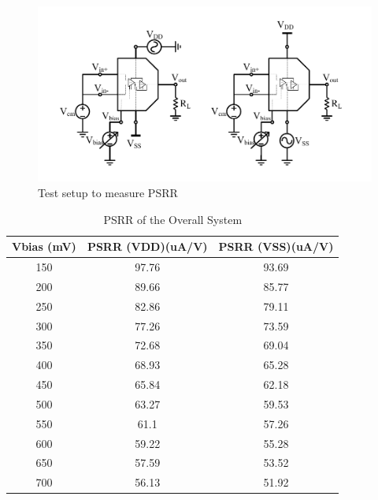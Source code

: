 \begin{figure} [H]
\centering
\includegraphics[scale=1]{Figures/Test_Benches/Overall/PSRR.pdf}
\caption{Test setup to measure PSRR}
\label{fig:TB_PSRR}
\end{figure}

\begin{table} [H]
\centering
\begin{tabular}{@{}ccc@{}}
\toprule
Vbias (mV)			& PSRR (VDD)(uA/V)			& PSRR (VSS)(uA/V)	 \\ \midrule
150					& 97.76	 					& 93.69					 \\
200					& 89.66 					& 85.77					 \\
250					& 82.86 					& 79.11					 \\
300					& 77.26 					& 73.59					 \\
350					& 72.68						& 69.04					 \\
400					& 68.93						& 65.28					 \\
450					& 65.84 					& 62.18					 \\
500					& 63.27						& 59.53					 \\
550					& 61.1	 					& 57.26					 \\
600					& 59.22 					& 55.28					 \\
650					& 57.59 					& 53.52					 \\
700 				& 56.13 					& 51.92					 \\
\bottomrule
\end{tabular}
\caption{PSRR of the Overall System}
\label{tab:PSRR}
\end{table}

